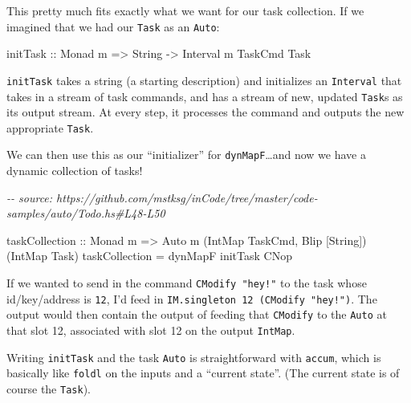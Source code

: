 \documentclass[]{article}
\newenvironment{Shaded}{}{}
\newcommand{\CommentTok}[1]{\textcolor[rgb]{0.38,0.63,0.69}{\textit{#1}}}
\newcommand{\DataTypeTok}[1]{\textcolor[rgb]{0.56,0.13,0.00}{#1}}
\newcommand{\NormalTok}[1]{#1}
\newcommand{\OtherTok}[1]{\textcolor[rgb]{0.00,0.44,0.13}{#1}}
\begin{document}
This pretty much fits exactly what we want for our task collection. If we
imagined that we had our \texttt{Task} as an \texttt{Auto}:

\begin{Shaded}
\begin{Highlighting}[]
\OtherTok{initTask ::} \DataTypeTok{Monad}\NormalTok{ m }\OtherTok{=\textgreater{}} \DataTypeTok{String} \OtherTok{{-}\textgreater{}} \DataTypeTok{Interval}\NormalTok{ m }\DataTypeTok{TaskCmd} \DataTypeTok{Task}
\end{Highlighting}
\end{Shaded}

\texttt{initTask} takes a string (a starting description) and initializes an
\texttt{Interval} that takes in a stream of task commands, and has a stream of
new, updated \texttt{Task}s as its output stream. At every step, it processes
the command and outputs the new appropriate \texttt{Task}.

We can then use this as our ``initializer'' for \texttt{dynMapF}\ldots and now
we have a dynamic collection of tasks!

\begin{Shaded}
\begin{Highlighting}[]
\CommentTok{{-}{-} source: https://github.com/mstksg/inCode/tree/master/code{-}samples/auto/Todo.hs\#L48{-}L50}

\OtherTok{taskCollection ::} \DataTypeTok{Monad}\NormalTok{ m}
               \OtherTok{=\textgreater{}} \DataTypeTok{Auto}\NormalTok{ m (}\DataTypeTok{IntMap} \DataTypeTok{TaskCmd}\NormalTok{, }\DataTypeTok{Blip}\NormalTok{ [}\DataTypeTok{String}\NormalTok{]) (}\DataTypeTok{IntMap} \DataTypeTok{Task}\NormalTok{)}
\NormalTok{taskCollection }\OtherTok{=}\NormalTok{ dynMapF initTask }\DataTypeTok{CNop}
\end{Highlighting}
\end{Shaded}

If we wanted to send in the command \texttt{CModify\ "hey!"} to the task whose
id/key/address is \texttt{12}, I'd feed in
\texttt{IM.singleton\ 12\ (CModify\ "hey!")}. The output would then contain the
output of feeding that \texttt{CModify} to the \texttt{Auto} at that slot 12,
associated with slot 12 on the output \texttt{IntMap}.

Writing \texttt{initTask} and the task \texttt{Auto} is straightforward with
\texttt{accum}, which is basically like \texttt{foldl} on the inputs and a
``current state''. (The current state is of course the \texttt{Task}).
\end{document}
